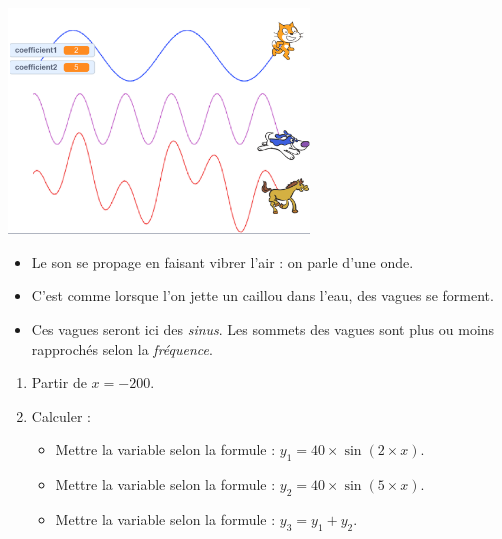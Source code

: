 \documentclass[class=report,crop=false, 12pt]{standalone}
\begin{document}
\begin{activite}

\begin{center}
\begin{scratch}
\end{scratch}
\end{center}


\end{activite}



\begin{activite}

\sauteligne

\begin{center}
  \includegraphics[width=0.6\textwidth]{ecran-09-ex2} 
\end{center}

\begin{itemize}
  \item Le son se propage en faisant vibrer l'air : on parle d'une onde. 
  \item C'est comme lorsque l'on jette un caillou dans l'eau, des vagues se forment.
  \item Ces vagues seront ici des \emph{sinus}. Les sommets des vagues sont plus ou moins rapprochés selon la \emph{fréquence}.
\end{itemize} 


\begin{enumerate}
  \item Partir de $x=-200$.
  
  \item Calculer :
  \begin{itemize}
    \item Mettre la variable  selon la formule : $y_1 = 40 \times \sin(2 \times x)$.
    \item Mettre la variable  selon la formule : $y_2 = 40 \times \sin(5 \times x)$.  
    \item Mettre la variable   selon la formule : $y_3 = y_1+y_2$.    
  \end{itemize}
  

\end{enumerate}
\end{activite}
\end{document}
